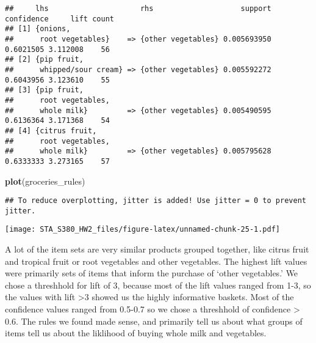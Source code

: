 \documentclass[]{article}
\newenvironment{Shaded}{\begin{snugshade}}{\end{snugshade}}
\newcommand{\KeywordTok}[1]{\textcolor[rgb]{0.13,0.29,0.53}{\textbf{#1}}}
\newcommand{\NormalTok}[1]{#1}
\begin{document}
\begin{verbatim}
##     lhs                     rhs                    support confidence     lift count
## [1] {onions,                                                                        
##      root vegetables}    => {other vegetables} 0.005693950  0.6021505 3.112008    56
## [2] {pip fruit,                                                                     
##      whipped/sour cream} => {other vegetables} 0.005592272  0.6043956 3.123610    55
## [3] {pip fruit,                                                                     
##      root vegetables,                                                               
##      whole milk}         => {other vegetables} 0.005490595  0.6136364 3.171368    54
## [4] {citrus fruit,                                                                  
##      root vegetables,                                                               
##      whole milk}         => {other vegetables} 0.005795628  0.6333333 3.273165    57
\end{verbatim}

\begin{Shaded}
\begin{Highlighting}[]
\KeywordTok{plot}\NormalTok{(groceries_rules)}
\end{Highlighting}
\end{Shaded}

\begin{verbatim}
## To reduce overplotting, jitter is added! Use jitter = 0 to prevent jitter.
\end{verbatim}

\texttt{[image: STA\_S380\_HW2\_files/figure-latex/unnamed-chunk-25-1.pdf]}

A lot of the item sets are very similar products grouped together, like
citrus fruit and tropical fruit or root vegetables and other vegetables.
The highest lift values were primarily sets of items that inform the
purchase of `other vegetables.' We chose a threshhold for lift of 3,
because most of the lift values ranged from 1-3, so the values with lift
\textgreater{}3 showed us the highly informative baskets. Most of the
confidence values ranged from 0.5-0.7 so we chose a threshhold of
confidence \textgreater{} 0.6. The rules we found made sense, and
primarily tell us about what groups of items tell us about the liklihood
of buying whole milk and vegetables.
\end{document}

